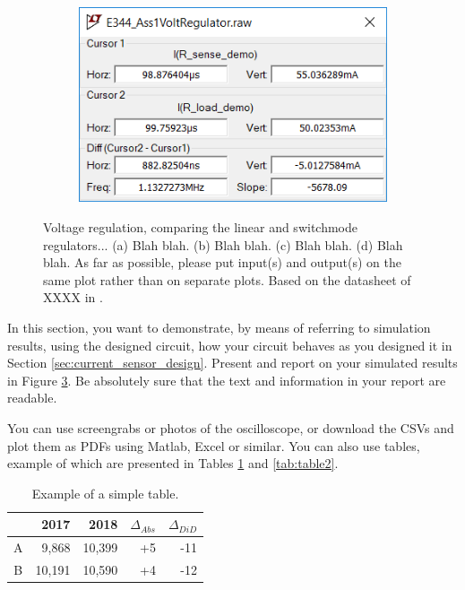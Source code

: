 \begin{figure}
\begin{subfigure}[]{0.55\textwidth}
		    \caption{} \label{subfig:pwr_simu_rect}
     \end{subfigure}
    \begin{subfigure}[]{0.4\textwidth}
              \centering
  		\includegraphics[width=1\linewidth]{./Figures/Screengrab2}
		    \caption{} \label{subfig:pwr_simu_rect}
     \end{subfigure}
   \caption[\textcolor{red}{I am the short caption that appears in the List of Figures list}]{Voltage regulation, comparing the linear and switchmode regulators... (a)  Blah blah. (b)  Blah blah.  (c)  Blah blah. (d) Blah blah.   As far as possible, please put input(s) and output(s) on the same plot rather than on separate plots. Based on the datasheet of XXXX in \cite{WebsiteOpAmp}.}
    \label{fig:simulation_results_box}
 \end{figure}

In this section, you want to demonstrate, by means of referring to simulation results, using the designed circuit, how your circuit behaves as you designed it in Section \ref{sec:current_sensor_design}. Present and report on your simulated results in Figure \ref{fig:simulation_results_box}. Be absolutely sure that the text and information in your report are readable. 

\noindent You can use screengrabs or photos of the oscilloscope, or download the CSVs and plot them as PDFs using Matlab, Excel or similar. 
You can also use tables, example of which are presented in Tables \ref{tab:table1} and \ref{tab:table2}.


\begin{table}[h]
        \centering
        \footnotesize
        \caption{Example of a simple table.}
         \begin{tabular}{c@{\qquad}rrrr}
          \toprule
             & 2017 & 2018 & $\Delta_{Abs}$ & $\Delta_{DiD}$\\
          \midrule
          A & 9,868      & 10,399 & +5 & -11\\
          B & 10,191     & 10,590 & +4 & -12\\
          \bottomrule
        \end{tabular}
     \label{tab:table1}
\end{table}


